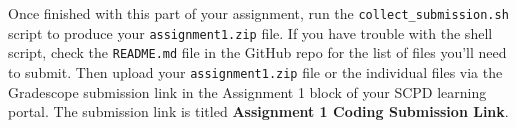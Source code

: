 Once finished with this part of your assignment, run the \texttt{collect\_submission.sh} script to produce your \texttt{assignment1.zip} file. If you have trouble with the shell script, check the \texttt{README.md} file in the GitHub repo for the list of files you'll need to submit. Then upload your \texttt{assignment1.zip} file or the individual files via the Gradescope submission link in the Assignment 1 block of your SCPD learning portal. The submission link is titled \textbf{Assignment 1 Coding Submission Link}.
